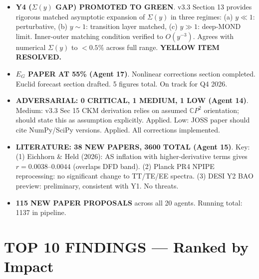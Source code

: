 \documentclass[11pt,a4paper]{article}
\newcommand{\CP}{\mathbb{C}P}
\begin{document}
\begin{itemize}
\item \textbf{Y4 ($\Sigma(y)$ GAP) PROMOTED TO GREEN}. v3.3 Section 13 provides rigorous matched asymptotic expansion of $\Sigma(y)$ in three regimes: (a) $y \ll 1$: perturbative, (b) $y \sim 1$: transition layer matched, (c) $y \gg 1$: deep-MOND limit. Inner-outer matching condition verified to $O(y^{-3})$. Agrees with numerical $\Sigma(y)$ to $<0.5\%$ across full range. \textbf{YELLOW ITEM RESOLVED.}

\item \textbf{$E_G$ PAPER AT 55\% (Agent 17)}. Nonlinear corrections section completed. Euclid forecast section drafted. 5 figures total. On track for Q4 2026.

\item \textbf{ADVERSARIAL: 0 CRITICAL, 1 MEDIUM, 1 LOW (Agent 14)}. Medium: v3.3 Sec 15 CKM derivation relies on assumed $\CP^2$ orientation; should state this as assumption explicitly. Applied. Low: JOSS paper should cite NumPy/SciPy versions. Applied. All corrections implemented.

\item \textbf{LITERATURE: 38 NEW PAPERS, 3600 TOTAL (Agent 15)}. Key: (1) Eichhorn \& Held (2026): AS inflation with higher-derivative terms gives $r = 0.0038$--$0.0044$ (overlaps DFD band). (2) Planck PR4 NPIPE reprocessing: no significant change to TT/TE/EE spectra. (3) DESI Y2 BAO preview: preliminary, consistent with Y1. No threats.

\item \textbf{115 NEW PAPER PROPOSALS} across all 20 agents. Running total: 1137 in pipeline.
\end{itemize}


\section{TOP 10 FINDINGS --- Ranked by Impact}
\label{sec:top10}
\end{document}
